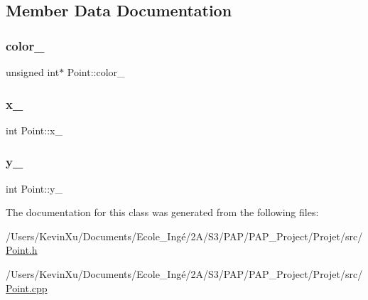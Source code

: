 \subsection{Member Data Documentation}
\mbox{\label{class_point_af3333647d73989850d2fbf64d14eb9cb}} 
\subsubsection{\texorpdfstring{color\+\_\+}{color\_}}
{\footnotesize\ttfamily unsigned int$\ast$ Point\+::color\+\_\+\hspace{0.3cm}{\ttfamily [private]}}

\mbox{\label{class_point_acfe156c55546f7e551fb54c7ea08a6cb}} 
\subsubsection{\texorpdfstring{x\+\_\+}{x\_}}
{\footnotesize\ttfamily int Point\+::x\+\_\+\hspace{0.3cm}{\ttfamily [private]}}

\mbox{\label{class_point_ae45effa2adb0036e4a770abb9b1160e6}} 
\subsubsection{\texorpdfstring{y\+\_\+}{y\_}}
{\footnotesize\ttfamily int Point\+::y\+\_\+\hspace{0.3cm}{\ttfamily [private]}}



The documentation for this class was generated from the following files\+:\begin{DoxyCompactItemize}
\item 
/\+Users/\+Kevin\+Xu/\+Documents/\+Ecole\+\_\+\+Ingé/2\+A/\+S3/\+P\+A\+P/\+P\+A\+P\+\_\+\+Project/\+Projet/src/\mbox{\hyperlink{_point_8h}{Point.\+h}}\item 
/\+Users/\+Kevin\+Xu/\+Documents/\+Ecole\+\_\+\+Ingé/2\+A/\+S3/\+P\+A\+P/\+P\+A\+P\+\_\+\+Project/\+Projet/src/\mbox{\hyperlink{_point_8cpp}{Point.\+cpp}}\end{DoxyCompactItemize}
